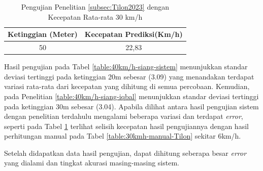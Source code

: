 \vspace{-10pt}
\begin{table}[H]
	\caption{Pengujian Penelitian \ref{subsec:Tilon2023} dengan Kecepatan Rata-rata 30 km/h}
    \label{table:30kmh-sistem-Tilon}
	\centering
	\begin{tabular}{|c|c|}
		\hline
		\textbf{Ketinggian (Meter)} & \textbf{Kecepatan Prediksi(Km/h)} \\ \hline
		50 & 22,83 \\ \hline
	\end{tabular}
\end{table}

Hasil pengujian pada Tabel \ref{table:40km/h-siang-sistem} menunjukkan standar deviasi tertinggi pada ketinggian 20m sebesar (3.09) yang menandakan terdapat variasi rata-rata dari kecepatan yang dihitung di semua percobaan. Kemudian, pada Penelitian \ref{table:40km/h-siang-iqbal} menunjukkan standar deviasi tertinggi pada ketinggian 30m sebesar (3.04). Apabila dilihat antara hasil pengujian sistem dengan penelitian terdahulu mengalami beberapa variasi dan terdapat \emph{error}, seperti pada Tabel \ref{table:30kmh-sistem-Tilon} terlihat selisih kecepatan hasil pengujiannya dengan hasil perhitungan manual pada Tabel \ref{table:30kmh-manual-Tilon} sekitar 6km/h.

Setelah didapatkan data hasil pengujian, dapat dihitung seberapa besar \emph{error} yang dialami dan tingkat akurasi masing-masing sistem.

